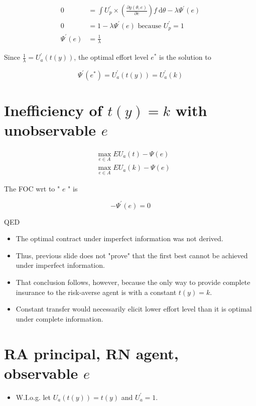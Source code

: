 \documentclass[10pt]{article}
\begin{document}
$$
\begin{aligned}
0 & =\int U_{p}^{\prime} \times\left(\frac{\partial y(\theta, e)}{\partial e}\right) f \mathrm{~d} \theta-\lambda \Psi^{\prime}(e) \\
0 & =1-\lambda \Psi^{\prime}(e) \text { because } U_{p}^{\prime}=1 \\
\Psi^{\prime}(e) & =\frac{1}{\lambda}
\end{aligned}
$$

Since $\frac{1}{\lambda}=U_{a}^{\prime}(t(y))$, the optimal effort level $e^{*}$ is the solution to

$$
\Psi^{\prime}\left(e^{*}\right)=U_{a}^{\prime}(t(y))=U_{a}^{\prime}(k)
$$

\section*{Inefficiency of $t(y)=k$ with unobservable $e$}
$$
\begin{aligned}
& \max _{e \in A} E U_{a}(t)-\Psi(e) \\
& \max _{e \in A} E U_{a}(k)-\Psi(e)
\end{aligned}
$$

The FOC wrt to " $e$ " is

$$
-\Psi^{\prime}(e)=0
$$

QED

\begin{itemize}
  \item The optimal contract under imperfect information was not derived.
  \item Thus, previous slide does not "prove" that the first best cannot be achieved under imperfect information.
  \item That conclusion follows, however, because the only way to provide complete insurance to the risk-averse agent is with a constant $t(y)=k$.
  \item Constant transfer would necessarily elicit lower effort level than it is optimal under complete information.
\end{itemize}

\section*{RA principal, RN agent, observable $e$}
\begin{itemize}
  \item W.I.o.g. let $U_{a}(t(y))=t(y)$ and $U_{a}^{\prime}=1$.
\end{itemize}
\end{document}
